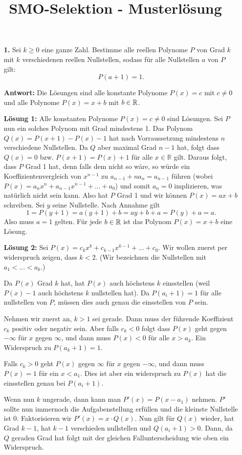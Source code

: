 \documentclass[language=german,style=solution]{smo}
\title{SMO-Selektion - Musterlösung}
\begin{document}
\begin{enumerate}

\item[\textbf{1.}] %
Sei $k \geq 0$ eine ganze Zahl. Bestimme alle reellen Polynome $P$ von Grad $k$ mit $k$ verschiedenen reellen Nullstellen, sodass für alle Nullstellen $a$ von $P$ gilt:
\[
P(a+1) = 1.
\]

\textbf{Antwort:} Die Lösungen sind alle konstante Polynome $P(x) = c$ mit $c\neq 0$ und alle Polynome $P(x) = x+b$ mit $b\in\mathbb{R}$.

\textbf{Lösung 1:}
Alle konstanten Polynome \(P(x)=c\neq 0 \) sind Lösungen. Sei \(P\) nun ein solches Polynom mit Grad mindestens 1. Das Polynom \(Q(x)=P(x+1)-P(x)-1\) hat nach Vorraussetzung mindestens \(n\) verschiedene Nullstellen. Da \(Q\) aber maximal Grad \(n-1\) hat, folgt dass \(Q(x)=0\) bzw. \(P(x+1)=P(x)+1\) für alle \(x\in \mathbb{R}\) gilt. Daraus folgt, dass \(P\) Grad 1 hat, denn falls dem nicht so wäre, so würde ein Koeffizientenvergleich von \(x^{n-1}\) zu \(a_{n-1}+na_n=a_{n-1}\) führen (wobei \(P(x)=a_nx^n+a_{n-1}x^{n-1}+...+a_0 \)) und somit \(a_n=0\) implizieren, was natürlich nicht sein kann. Also hat $P$ Grad 1 und wir können $P(x) = ax + b$ schreiben. Sei $y$ seine Nullstelle. Nach Annahme gilt
\[
	1 = P(y+1) = a(y+1) + b = ay + b + a = P(y) + a = a.
\]
Also muss $a=1$ gelten. Für jede $b\in \mathbb{R}$ ist das Polynom $P(x) = x + b$ eine Lösung.

\textbf{Lösung 2:}
Sei $P(x) = c_k x^k + c_{k-1} x^{k-1}+...+c_0$. Wir wollen zuerst per widerspruch zeigen, dass $k<2$. (Wir bezeichnen die Nullstellen mit $a_1<\ldots<a_k$.)

Da $P(x)$ Grad $k$ hat, hat $P(x)$ auch höchstens $k$ einsstellen (weil $P(x)-1$ auch höchstens $k$ nullstellen hat). Da $P(a_i+1) = 1$ für alle nullstellen von $P$, müssen dies auch genau die einsstellen von $P$ sein.

Nehmen wir zuerst an, $k>1$ sei gerade. Dann muss der führende Koeffizient $c_k$ positiv oder negativ sein. Aber falls $c_k<0$ folgt dass $P(x)$ geht gegen $-\infty$ für $x$ gegen $\infty$, und dann muss $P(x) <0$ für alle $x > a_k$. Ein Widerspruch zu $P(a_k+1) = 1$.

Falls $c_k>0$ geht $P(x)$ gegen $\infty$ für $x$ gegen $-\infty$, und dann muss $P(x) = 1$ für ein $x < a_1$. Dies ist aber ein widerspruch zu $P(x)$ hat die einsstellen genau bei $P(a_i+1)$.

Wenn nun $k$ ungerade, dann kann man $P'(x) = P(x-a_1)$ nehmen. $P'$ sollte nun immernoch die Aufgabenstellung erfüllen und die kleinste Nullstelle ist $0$. Faktorisieren wir $P'(x) = x \cdot Q(x)$. Nun gilt für $Q(x)$ wieder, hat Grad $k-1$, hat $k-1$ verschieden nullstellen und $Q(a_i+1) > 0$. Dann, da $Q$ geraden Grad hat folgt mit der gleichen Fallunterscheidung wie oben ein Widerspruch.


\end{enumerate}
\end{document}
